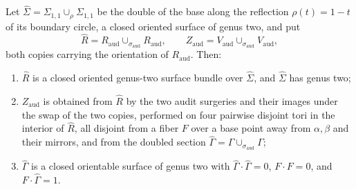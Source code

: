 \begin{corollary}\label{cor:audit-double}
Let $\hat\Sigma=\Sigma_{1,1}\cup_\rho\Sigma_{1,1}$ be the double of the
base along the reflection $\rho(t)=1-t$ of its boundary circle, a closed
oriented surface of genus two, and put
\[
 \hat R=R_{\mathrm{aud}}\cup_{\sigma_{\mathrm{aud}}}R_{\mathrm{aud}},
 \qquad
 Z_{\mathrm{aud}}=V_{\mathrm{aud}}\cup_{\sigma_{\mathrm{aud}}}V_{\mathrm{aud}},
\]
both copies carrying the orientation of $R_{\mathrm{aud}}$.  Then:
\begin{enumerate}
\item[(a)] $\hat R$ is a closed oriented genus-two surface bundle over
 $\hat\Sigma$, and $\hat\Sigma$ has genus two;
\item[(b)] $Z_{\mathrm{aud}}$ is obtained from $\hat R$ by the two audit
 surgeries and their images under the swap of the two copies, performed on
 four pairwise disjoint tori in the interior of $\hat R$, all disjoint from
 a fiber $F$ over a base point away from $\alpha,\beta$ and their mirrors,
 and from the doubled section
 $\hat\Gamma=\Gamma\cup_{\sigma_{\mathrm{aud}}}\Gamma$;
\item[(c)] $\hat\Gamma$ is a closed orientable surface of genus two with
 $\hat\Gamma\cdot\hat\Gamma=0$, $F\cdot F=0$, and $F\cdot\hat\Gamma=1$.
\end{enumerate}
\end{corollary}

